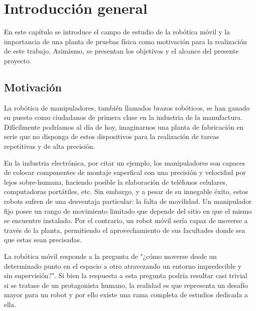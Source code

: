 
\chapter{Introducción general}

\label{Chapter1}

En este capítulo se introduce el campo de estudio de la robótica móvil y la importancia de una planta de pruebas física como motivación para la realización de este trabajo. Asimismo, se presentan los objetivos y el alcance del presente proyecto.


\section{Motivación}

La robótica de manipuladores, también llamados brazos robóticos, se han ganado su puesto como ciudadanos de primera clase en la industria de la manufactura. Difícilmente podríamos al día de hoy, imaginarnos una planta de fabricación en serie que no disponga de estos dispositivos para la realización de tareas repetitivas y de alta precisión.

En la industria electrónica, por citar un ejemplo, los manipuladores son capaces de colocar componentes de montaje superfical con una precisión y velocidad por lejos sobre-humana, haciendo posible la elaboración de teléfonos celulares, computadoras portátiles, etc.
Sin embargo, y a pesar de su innegable éxito, estos robots sufren de una desventaja particular: la falta de movilidad. Un manipulador fijo posee un rango de movimiento limitado que depende del sitio en que el mismo se encuentre instalado. Por el contrario, un robot móvil sería capaz de moverse a través de la planta, permitiendo el aprovechamiento de sus facultades donde sea que estas sean precisadas.

La robótica móvil responde a la pregunta de "¿cómo moverse desde un determinado punto en el espacio a otro atravezando un entorno impredecible y sin supervisión?". Si bien la respuesta a esta pregunta podría resultar casi trivial si se tratase de un protagonista humano, la realidad es que representa un desafío mayor para un robot y por ello existe una rama completa de estudios dedicada a ella.

